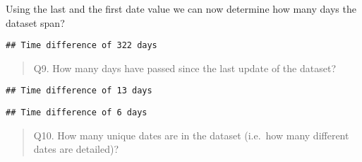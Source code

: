 \documentclass[
]{article}
\newenvironment{Shaded}{\begin{snugshade}}{\end{snugshade}}
\newcommand{\DecValTok}[1]{\textcolor[rgb]{0.00,0.00,0.81}{#1}}
\newcommand{\FunctionTok}[1]{\textcolor[rgb]{0.00,0.00,0.00}{#1}}
\newcommand{\NormalTok}[1]{#1}
\newcommand{\SpecialCharTok}[1]{\textcolor[rgb]{0.00,0.00,0.00}{#1}}
\begin{document}
Using the last and the first date value we can now determine how many
days the dataset span?

\begin{Shaded}
\end{Shaded}

\begin{verbatim}
## Time difference of 322 days
\end{verbatim}

\begin{quote}
Q9. How many days have passed since the last update of the dataset?
\end{quote}

\begin{Shaded}
\end{Shaded}

\begin{verbatim}
## Time difference of 13 days
\end{verbatim}

\begin{Shaded}
\end{Shaded}

\begin{verbatim}
## Time difference of 6 days
\end{verbatim}

\begin{quote}
Q10. How many unique dates are in the dataset (i.e.~how many different
dates are detailed)?
\end{quote}

\begin{Shaded}
\end{Shaded}
\end{document}
